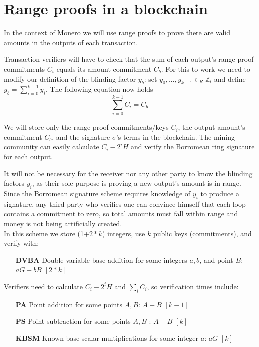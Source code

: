 \section{Range proofs in a blockchain}
\label{range_proofs_blockchain_section}

In the context of Monero we will use range proofs to prove there are valid amounts in the outputs of each transaction.

Transaction verifiers will have to check that the sum of each output's range proof commitments $C_i$ equals its amount commitment $C_b$. For this to work we need to modify our definition of the blinding factor $y_b$: set $y_0, ..., y_{k-1} \in_R \mathbb{Z}_l$ and define $y_{b} = \sum_{i=0}^{k-1} y_i$. The following equation now holds
\[\sum^{k-1}_{i=0} C_i = C_b\]

We will store only the range proof commitments/keys $C_i$, the output amount's commitment $C_b$, and the signature $\sigma$'s terms in the blockchain. The mining community can easily calculate $C_i - 2^i H$ and verify the Borromean ring signature for each output.

It will not be necessary for the receiver nor any other party to know the blinding factors $y_i$, as their sole purpose is proving a new output's amount is in range. 
\\

Since the Borromean signature scheme requires knowledge of $y_i$ to produce a signature, any third party who verifies one can convince himself that each loop contains a commitment to zero, so total amounts must fall within range and money is not being artificially created.\\

In this scheme we store (1+$2*k$) integers, use $k$ public keys (commitments), and verify with:

\begin{itemize}
    \setlength\itemsep{\listspace}
    \item [\textbf{DVBA}] Double-variable-base addition for some integers $a, b$, and point $B$: $a G + b B$ \quad \([2*k]\)
\end{itemize}

Verifiers need to calculate $C_i - 2^i H$ and $\sum_i C_i$, so verification times include:

\begin{itemize}
    \setlength\itemsep{\listspace}
    \item [\textbf{PA}] Point addition for some points $A, B$: $A + B$ \quad \([k-1]\)
    \item [\textbf{PS}] Point subtraction for some points $A, B$ : $A - B$ \quad \([k]\)
    \item [\textbf{KBSM}] Known-base scalar multiplications for some integer $a$: $a G$ \quad \([k]\)
\end{itemize}

